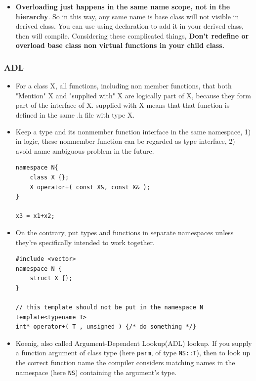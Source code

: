 \documentclass[a4paper,11pt,twoside]{book}
\begin{document}
\begin{itemize}
\begin{enumerate}
	\end{enumerate}

	\item  \textbf{Overloading just happens in the same name scope, not in the hierarchy}. So in this way, any same name is base class will not visible in derived class. You can use using declaration to add it in your derived class, then will compile. Considering these complicated things, \textbf{Don't redefine or overload base class non virtual functions in your child class.}

\end{itemize}

\subsubsection{ADL}
\begin{itemize}
	\item For a class X, all functions, including non member functions, that both "Mention" X and "supplied with" X are logically part of X, because they form part of the interface of X. supplied with X means that that function is defined in the same .h file with type X. 
	
	\item Keep a type and its nonmember function interface in the same namespace, 1) in logic, these nonmember function can be regarded as type interface, 2) avoid name ambiguous problem in the future.
\begin{lstlisting}[numbers=none]
namespace N{
	class X {};
	X operator+( const X&, const X& );
}

x3 = x1+x2;	
\end{lstlisting}	
	
	\item On the contrary, put types and functions in separate namespaces unless they're specifically intended to work together.
	
\begin{lstlisting}[numbers=none]
#include <vector>
namespace N {
	struct X {};
}

// this template should not be put in the namespace N
template<typename T>
int* operator+( T , unsigned ) {/* do something */}	
\end{lstlisting}	
	
	
	\item Koenig, also called Argument-Dependent Lookup(ADL) lookup. If you supply a function argument of class type (here \texttt{parm}, of type \texttt{NS::T}), then to look up the correct function name the compiler considers matching names in the namespace (here \texttt{NS}) containing the argument's type.
	

\end{itemize}
\end{document}
